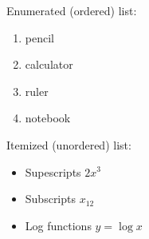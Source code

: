 \documentclass[11pt]{article}
\begin{document}
Enumerated (ordered) list:
\begin{enumerate}
\item pencil
\item calculator
\item ruler
\item notebook
\end{enumerate}

Itemized (unordered) list:
\begin{itemize}
\item Supescripts $2x^3$
\item Subscripts $x_{12}$
\item Log functions $y=\log x$
\end{itemize}
\end{document}

